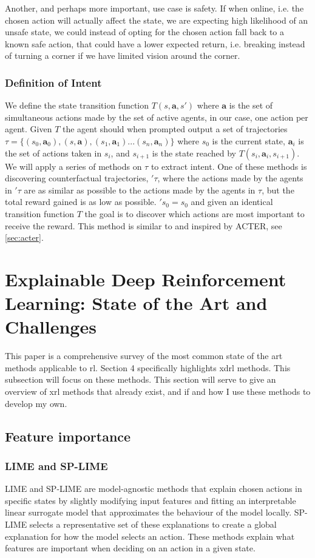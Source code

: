 \documentclass[UKenglish]{uiomasterthesis}
\begin{document}
Another, and perhaps more important, use case is safety. If when online, i.e. the chosen action will actually affect the state, we are expecting high likelihood of an unsafe state, we could instead of opting for the chosen action fall back to a known safe action, that could have a lower expected return, i.e. breaking instead of turning a corner if we have limited vision around the corner.


\subsubsection{Definition of Intent}
We define the state transition function $T(s, \textbf{a}, s')$ where $\textbf{a}$ is the set of simultaneous actions made by the set of active agents, in our case, one action per agent. Given $T$ the agent should when prompted output a set of trajectories $\tau = \{(s_0,\textbf{a}_0),(s,\textbf{a}),(s_1,\textbf{a}_1)...(s_n,\textbf{a}_n)\}$ where $s_0$ is the current state, $\textbf{a}_i$ is the set of actions taken in $s_i$, and $s_{i+1}$ is the state reached by $T(s_i,\textbf{a}_i, s_{i+1})$. We will apply a series of methods on $\tau$ to extract intent. One of these methods is discovering counterfactual trajectories, $'\tau$, where the actions made by the agents in $'\tau$ are as similar as possible to the actions made by the agents in $\tau$, but the total reward gained is as low as possible. $'s_0 = s_0$ and given an identical transition function $T$ the goal is to discover which actions are most important to receive the reward. This method is similar to and inspired by ACTER\cite{gajcin2024acter}, see \cref{sec:acter}.

\section{Explainable Deep Reinforcement Learning: State of the Art and Challenges}
This paper is a comprehensive survey of the most common state of the art methods applicable to \ac{rl}. Section 4 specifically highlights \ac{xdrl} methods. This subsection will focus on these methods\cite{sota}. This section will serve to give an overview of \ac{xrl} methods that already exist, and if and how I use these methods to develop my own.

\subsection{Feature importance}


\subsubsection{LIME and SP-LIME}
LIME and SP-LIME are model-agnostic methods that explain chosen actions in specific states by slightly modifying input features and fitting an interpretable linear surrogate model that approximates the behaviour of the model locally. SP-LIME selects a representative set of these explanations to create a global explanation for how the model selects an action. These methods explain what features are important when deciding on an action in a given state.
\end{document}

